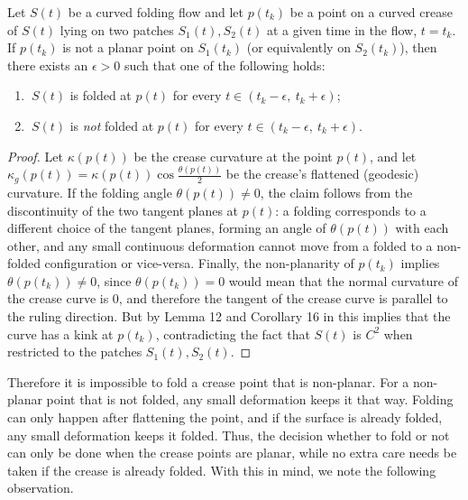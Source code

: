 \begin{theorem}\label{Thm:curved_folding_open_condition}
Let $S(t)$ be a curved folding flow and let $p(t_k)$ be a point on a curved crease of $S(t)$ lying on two patches $S_1(t),S_2(t)$ at a given time in the flow, $t=t_k$. If $p(t_k)$ is not a planar point on $S_1(t_k)$ (or equivalently on $S_2(t_k)$), then there exists an $\epsilon > 0$ such that one of the following holds:
\begin{enumerate}
	\item $\ S(t)$ is folded at $p(t)$ for every $t \in (t_k-\epsilon, \ t_k+\epsilon)$;
	\item $\ S(t)$ is \emph{not} folded at $p(t)$ for every $t \in (t_k-\epsilon, \ t_k+\epsilon)$.
\end{enumerate}
\end{theorem}
\begin{proof}
Let $\kappa(p(t))$ be the crease curvature at the point $p(t)$, and let $\kappa_g(p(t)) = \kappa(p(t))\cos\frac{\theta(p(t))}{2}$ be the crease's flattened (geodesic) curvature. If the folding angle $\theta(p(t)) \neq 0$, the claim follows from the discontinuity of the two tangent planes at $p(t)$: a folding corresponds to a different choice of the tangent planes, forming an angle of $\theta(p(t))$ with each other, and any small continuous deformation cannot move from a folded to a non-folded configuration or vice-versa. Finally, the non-planarity of $p(t_k)$ implies $\theta(p(t_k)) \neq 0$, since $\theta(p(t_k)) = 0$ would mean that the normal curvature of the crease curve is $0$, and therefore the tangent of the crease curve is parallel to the ruling direction.
But by Lemma 12 and Corollary 16 in \cite{demaine_lens} this implies that the curve has a kink at  $p(t_k)$, contradicting the fact that $S(t)$ is $C^2$ when restricted to the patches $S_1(t), S_2(t)$.
\end{proof}

Therefore it is impossible to fold a crease point that is non-planar. For a non-planar point that is not folded, any small deformation keeps it that way. Folding can only happen after flattening the point, and if the surface is already folded, any small deformation keeps it folded. Thus, the decision whether to fold or not can only be done when the crease points are planar, while no extra care needs be taken if the crease is already folded. With this in mind, we note the following observation.

